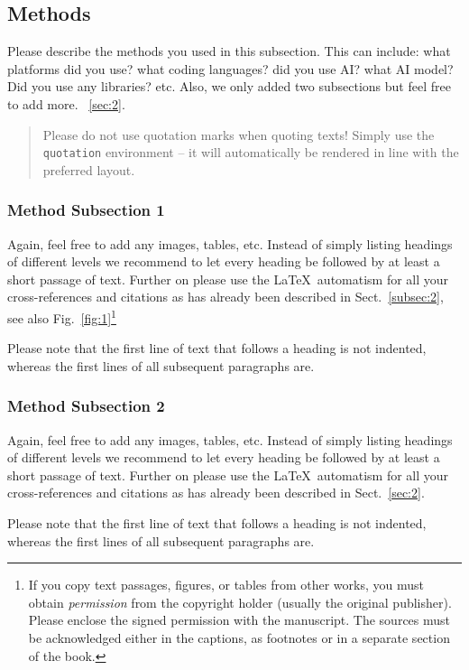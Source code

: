 \documentclass[graybox]{svmult}
\begin{document}
\subsection{Methods}
\label{subsec:5}
Please describe the methods you used in this subsection. This can include: what platforms did you use? what coding languages? did you use AI? what AI model? Did you use any libraries? etc. Also, we only added two subsections but feel free to add more. ~\ref{sec:2}.

\begin{quotation}
Please do not use quotation marks when quoting texts! Simply use the \verb|quotation| environment -- it will automatically be rendered in line with the preferred layout.
\end{quotation}


\subsubsection{Method Subsection 1}
Again, feel free to add any images, tables, etc.
Instead of simply listing headings of different levels we recommend to let every heading be followed by at least a short passage of text.  Further on please use the \LaTeX\ automatism for all your cross-references and citations as has already been described in Sect.~\ref{subsec:2}, see also Fig.~\ref{fig:1}\footnote{If you copy text passages, figures, or tables from other works, you must obtain \textit{permission} from the copyright holder (usually the original publisher). Please enclose the signed permission with the manuscript. The sources must be acknowledged either in the captions, as footnotes or in a separate section of the book.}

Please note that the first line of text that follows a heading is not indented, whereas the first lines of all subsequent paragraphs are.


\subsubsection{Method Subsection 2}
Again, feel free to add any images, tables, etc.
Instead of simply listing headings of different levels we recommend to let every heading be followed by at least a short passage of text.  Further on please use the \LaTeX\ automatism for all your cross-references and citations as has already been described in Sect.~\ref{sec:2}.

Please note that the first line of text that follows a heading is not indented, whereas the first lines of all subsequent paragraphs are.
\end{document}
